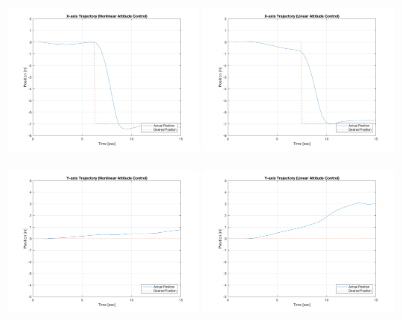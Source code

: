 \begin{figure}
    \centering
    \includegraphics[width=0.45\textwidth]{graphics/experiment_plots/pitch_minus_non_position_x.png}
    \includegraphics[width=0.45\textwidth]{graphics/experiment_plots/pitch_minus_pid_position_x.png}
    
    \includegraphics[width=0.45\textwidth]{graphics/experiment_plots/pitch_minus_non_position_y.png}
    \includegraphics[width=0.45\textwidth]{graphics/experiment_plots/pitch_minus_pid_position_y.png}
    

\end{figure}
